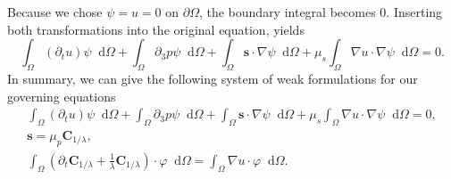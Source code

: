 \documentclass[12pt,a4paper,twoside, open=right]{scrreprt}
\theoremstyle{definition}
\theoremstyle{plain}
\newcommand{\bfs}{\bm{s}}
\newcommand{\bfC}{\bm{C}}
\newcommand{\D}{\mathop{}\!\mathrm{d}}
\begin{document}
Because we chose $\psi=u = 0$ on $\partial\Omega$, the boundary integral becomes $0$. Inserting both transformations into the original equation, yields
\begin{equation}
    \int_\Omega(\partial_t u)\psi\D\Omega +\int_\Omega\partial_3 p\psi\D\Omega + \int_\Omega\bfs\cdot\nabla\psi\D\Omega+\mu_s\int_\Omega\nabla u\cdot\nabla\psi\D\Omega = 0.
\end{equation}
In summary, we can give the following system of weak formulations for our governing equations
\begin{align}
\label{eq:weaktimecon1}
     \int_\Omega(\partial_t u)\psi\D\Omega +\int_\Omega\partial_3 p\psi\D\Omega + \int_\Omega\bfs\cdot\nabla\psi\D\Omega+\mu_s\int_\Omega\nabla u\cdot\nabla\psi\D\Omega = 0,\\
     \label{eq:weaktimecon2}\bfs =\mu_p\bfC_{1/\lambda},\\
     \label{eq:weaktimecon3}
      \int_\Omega(\partial_t\bfC_{1/\lambda}+\frac{1}{\lambda}\bfC_{1/\lambda})\cdot\varphi\D\Omega = 
     \int_\Omega \nabla u\cdot\varphi\D\Omega.
\end{align}
\end{document}

